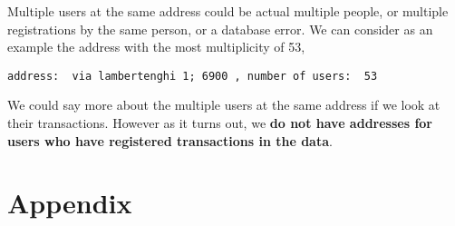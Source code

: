 \documentclass{report}
\begin{document}
    Multiple users at the same address could be actual multiple people, or
multiple registrations by the same person, or a database error. We can
consider as an example the address with the most multiplicity of 53,


    \begin{Verbatim}[commandchars=\\\{\}]
address:  via lambertenghi 1; 6900 , number of users:  53
    \end{Verbatim}

    We could say more about the multiple users at the same address if we
look at their transactions. However as it turns out, we \textbf{do not
have addresses for users who have registered transactions in the data}.




%    
%
%        
    
    \section{Appendix}\label{appendix}
\end{document}
